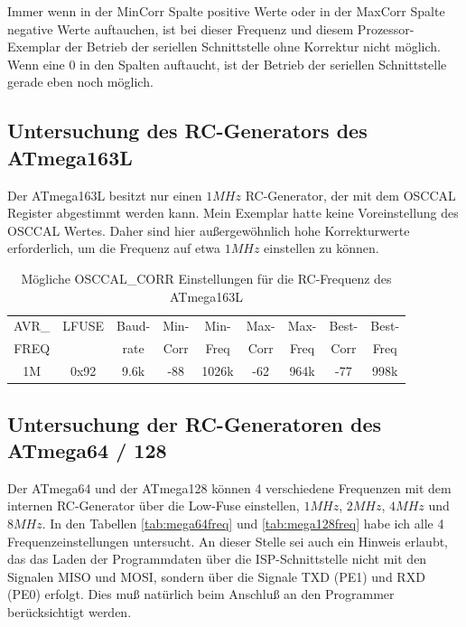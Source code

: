 Immer wenn in der MinCorr Spalte positive Werte oder in der MaxCorr Spalte negative
Werte auftauchen, ist bei dieser Frequenz und diesem Prozessor-Exemplar der Betrieb
der seriellen Schnittstelle ohne Korrektur nicht möglich.
Wenn eine 0 in den Spalten auftaucht, ist der Betrieb der seriellen Schnittstelle
gerade eben noch möglich.

\subsection{Untersuchung des RC-Generators des ATmega163L}

Der ATmega163L besitzt nur einen \(1MHz\) RC-Generator, der mit dem OSCCAL Register
abgestimmt werden kann. Mein Exemplar hatte keine Voreinstellung des OSCCAL Wertes.
Daher sind hier außergewöhnlich hohe Korrekturwerte erforderlich, um die Frequenz
auf etwa \(1MHz\) einstellen zu können.

\begin{table}[H]
  \begin{center}
    \begin{tabular}{| c | c | c || c | c || c | c || c | c |}
    \hline
             AVR\_ & LFUSE & Baud- & Min- & Min- & Max- & Max- & Best- & Best-  \\
             FREQ  &       & rate & Corr & Freq & Corr & Freq  & Corr  & Freq  \\
    \hline
    \hline
                1M & 0x92  &  9.6k &  -88  & 1026k &  -62  & 964k  & -77  &  998k \\
    \hline
    \end{tabular}
  \end{center}
  \caption{Mögliche OSCCAL\_CORR Einstellungen für die RC-Frequenz des ATmega163L}
  \label{tab:mega163freq}
\end{table}

\subsection{Untersuchung der RC-Generatoren des ATmega64 / 128}

Der ATmega64 und der ATmega128 können 4 verschiedene Frequenzen mit dem internen RC-Generator
über die Low-Fuse einstellen, \(1MHz\), \(2MHz\), \(4MHz\) und \(8MHz\).
In den Tabellen \ref{tab:mega64freq} und \ref{tab:mega128freq} habe ich alle 
4 Frequenzeinstellungen untersucht.
An dieser Stelle sei auch ein Hinweis erlaubt, das das Laden der Programmdaten über die 
ISP-Schnittstelle nicht mit den Signalen MISO und MOSI, sondern über die Signale TXD (PE1) und RXD (PE0)
erfolgt. Dies muß natürlich beim Anschluß an den Programmer berücksichtigt werden.

